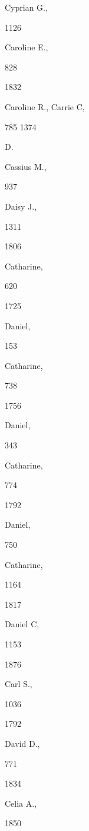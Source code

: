 \documentclass{book}
\begin{document}
Cyprian G., 


1126 




Caroline E., 


828 








1832 


Caroline R., 
Carrie C, 


785 
1374 




D. 






Cassius M., 


937 




Daisy J., 


1311 


1806 


Catharine, 


620 


1725 


Daniel, 


153 




Catharine, 


738 


1756 


Daniel, 


343 




Catharine, 


774 


1792 


Daniel, 


750 




Catharine, 


1164 


1817 


Daniel C, 


1153 


1876 


Carl S., 


1036 


1792 


David D., 


771 


1834 


Celia A., 


1850 
\end{document}
